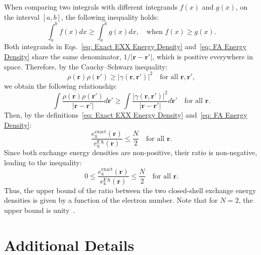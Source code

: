 \documentclass[%
 reprint,
 amsmath,amssymb,
 aps,
pra,
]{revtex4-2}
\begin{document}
When comparing two integrals with different integrands $f(x)$ and $g(x)$, on the interval $[a,b]$, the following inequality holds:
\begin{equation}
    \int_{a}^{b}
    f(x)dx
    \geq
    \int_{a}^{b}
    g(x)dx,
    \quad
    \text{when }
    f(x)\geq g(x).
\end{equation}
Both integrands in Eqs.~\eqref{eq: Exact EXX Energy Density} and~\eqref{eq: FA Energy Density} share the same denominator, $1/|\mathbf{r}-\mathbf{r}'|$, which is positive everywhere in space. Therefore, by the Cauchy--Schwarz inequality:
\begin{equation}
    \rho(\mathbf{r})\rho(\mathbf{r}')
    \geq
    |\gamma(\mathbf{r},\mathbf{r}')|^2
    \quad
    \text{for all }
    \mathbf{r}, \mathbf{r}',
\end{equation}
we obtain the following relationship:
\begin{equation}
    \int
    \frac
    {\rho(\mathbf{r})\rho(\mathbf{r}')}
    {|\mathbf{r}-\mathbf{r}'|}
    d\mathbf{r}'
    \geq
    \int
    \frac
    {|\gamma(\mathbf{r},\mathbf{r}')|^2}
    {|\mathbf{r}-\mathbf{r}'|}
    d\mathbf{r}'
    \quad
    \text{for all }
    \mathbf{r}.
\end{equation}
Then, by the definitions~\eqref{eq: Exact EXX Energy Density} and~\eqref{eq: FA Energy Density}:
\begin{equation}
    \frac
    {e_{\text{x}}^{\text{exact}}(\mathbf{r})}
    {e_{\text{x}}^{\text{FA}}(\mathbf{r})}
    \leq
    \frac{N}{2}
    \quad
    \text{for all }
    \mathbf{r}.
\end{equation}
Since both exchange energy densities are non-positive, their ratio is non-negative, leading to the inequality:
\begin{equation}
    0
    \leq
    \frac
    {e_{\text{x}}^{\text{exact}}(\mathbf{r})}
    {e_{\text{x}}^{\text{FA}}(\mathbf{r})}
    \leq
    \frac{N}{2}
    \quad
    \text{for all }
    \mathbf{r}.
\end{equation}
Thus, the upper bound of the ratio between the two closed-shell exchange energy densities is given by a function of the electron number. Note that for $N=2$, the upper bound is unity~\cite{Bosko.2023.JCP.159.131101,Bosko.2023.PRA.108.052803,Ayers.2005.MP.103.2061}.

\section{Additional Details}
\end{document}
